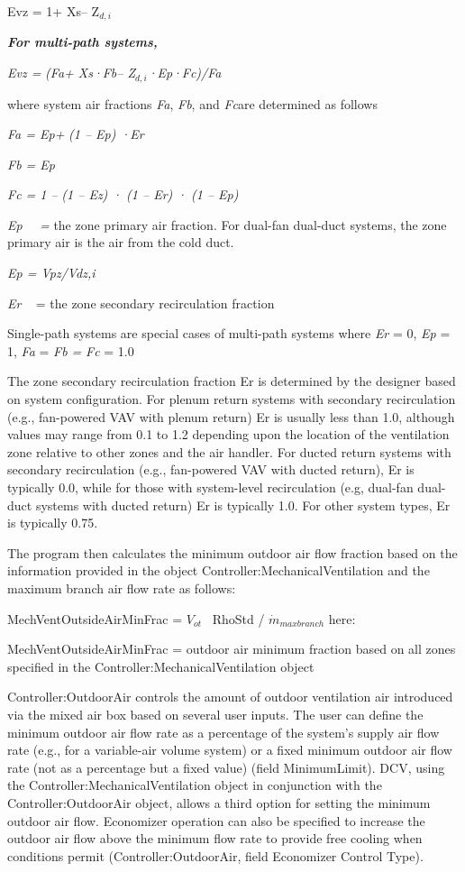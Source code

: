 Evz = 1+ Xs-- Z\(_{d,i}\)

\textbf{\emph{For multi-path systems,}}

\emph{Evz =} \emph{(Fa+ Xs·Fb-- Z\(_{d,i}\)·Ep·Fc)/Fa}

where system air fractions \emph{Fa}, \emph{Fb}, and \emph{Fc}are determined as follows

\emph{Fa = Ep+} \emph{(1 -- Ep) ·Er}

\emph{Fb = Ep}

\emph{Fc = 1 --} \emph{(1 -- Ez) · (1 -- Er) · (1 -- Ep)}

\emph{Ep~~ =} the zone primary air fraction. For dual-fan dual-duct systems, the zone primary air is the air from the cold duct.

\emph{Ep = Vpz/Vdz,i}

\emph{Er} ~ = the zone secondary recirculation fraction

Single-path systems are special cases of multi-path systems where \emph{Er} = 0, \emph{Ep} = 1, \emph{Fa} = \emph{Fb =} \emph{Fc} = 1.0

The zone secondary recirculation fraction Er is determined by the designer based on system configuration. For plenum return systems with secondary recirculation (e.g., fan-powered VAV with plenum return) Er is usually less than 1.0, although values may range from 0.1 to 1.2 depending upon the location of the ventilation zone relative to other zones and the air handler. For ducted return systems with secondary recirculation (e.g., fan-powered VAV with ducted return), Er is typically 0.0, while for those with system-level recirculation (e.g, dual-fan dual-duct systems with ducted return) Er is typically 1.0. For other system types, Er is typically 0.75.

The program then calculates the minimum outdoor air flow fraction based on the information provided in the object Controller:MechanicalVentilation and the maximum branch air flow rate as follows:

MechVentOutsideAirMinFrac = \({V_{ot}}\) ~RhoStd / \(\dot m{_{maxbranch}}\) here:

MechVentOutsideAirMinFrac = outdoor air minimum fraction based on all zones specified in the Controller:MechanicalVentilation object

Controller:OutdoorAir controls the amount of outdoor ventilation air introduced via the mixed air box based on several user inputs. The user can define the minimum outdoor air flow rate as a percentage of the system's supply air flow rate (e.g., for a variable-air volume system) or a fixed minimum outdoor air flow rate (not as a percentage but a fixed value) (field MinimumLimit). DCV, using the Controller:MechanicalVentilation object in conjunction with the Controller:OutdoorAir object, allows a third option for setting the minimum outdoor air flow. Economizer operation can also be specified to increase the outdoor air flow above the minimum flow rate to provide free cooling when conditions permit (Controller:OutdoorAir, field Economizer Control Type).

